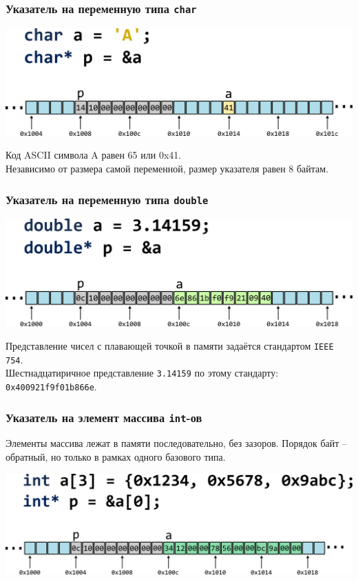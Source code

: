 \documentclass[12pt,pdf,hyperref={unicode}]{beamer}
\begin{document}
\begin{frame}[fragile]
\frametitle{Указатель на переменную типа \texttt{char}} 
\begin{center}
\includegraphics[width=1\linewidth]{../images/memory/memory_4_pointer_to_char.png}
\end{center}
Код ASCII символа A равен 65 или 0x41. \\
Независимо от размера самой переменной, размер указателя равен 8 байтам.
\end{frame}

\begin{frame}[fragile]
\frametitle{Указатель на переменную типа \texttt{double}} 
\begin{center}
\includegraphics[width=1\linewidth]{../images/memory/memory_5_pointer_to_double.png}
\end{center}
Представление чисел с плавающей точкой в памяти задаётся стандартом \texttt{IEEE 754}.\\
Шестнадцатиричное представление \texttt{3.14159} по этому стандарту: \texttt{0x400921f9f01b866e}.
\end{frame}

\begin{frame}[fragile]
\frametitle{Указатель на элемент массива \texttt{int}-ов} 
Элементы массива лежат в памяти последовательно, без зазоров. 
Порядок байт -- обратный, но только в рамках одного базового типа.
\begin{center}
\includegraphics[width=0.95\linewidth]{../images/memory/memory_6_pointer_to_int_array.png}
\end{center}
\end{frame}
\end{document}
